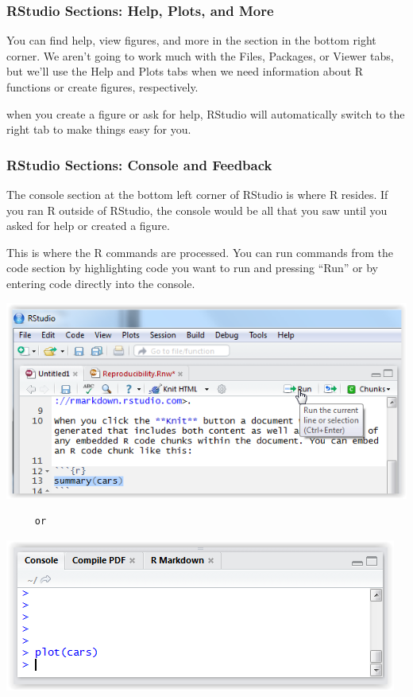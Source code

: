 \documentclass[12pt]{article}
\begin{document}
\subsubsection{RStudio Sections: Help, Plots, and More}
You can find help, view figures, and more in the section in the bottom right corner.
We aren't going to work much with the Files, Packages, or Viewer tabs, but we'll
use the Help and Plots tabs when we need information about R functions or create
figures, respectively.

when you create a figure or ask for help, RStudio will automatically switch to the
right tab to make things easy for you.

\subsubsection{RStudio Sections: Console and Feedback}
The console section at the bottom left corner of RStudio is where R resides. If
you ran R outside of RStudio, the console would be all that you saw until you
asked for help or created a figure.

This is where the R commands are processed. You can run commands from the code section
by highlighting code you want to run and pressing ``Run'' or by entering code directly
into the console.

\includegraphics{imgs/R05.PNG}

\begin{verbatim}     or\end{verbatim}

\includegraphics{imgs/R06.PNG}
\end{document}
